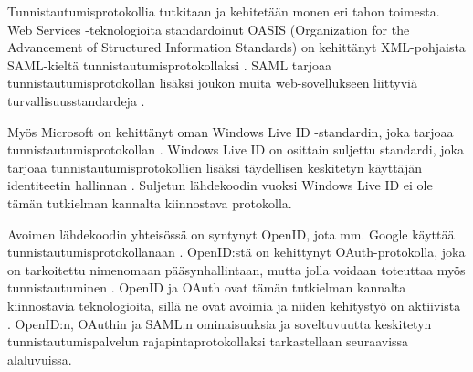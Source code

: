 Tunnistautumisprotokollia tutkitaan ja kehitetään monen eri tahon toimesta. Web Services -teknologioita standardoinut OASIS (Organization for the Advancement of Structured Information Standards) on kehittänyt XML-pohjaista SAML-kieltä tunnistautumisprotokollaksi \cite{saml_spec}. SAML tarjoaa tunnistautumisprotokollan lisäksi joukon muita web-sovellukseen liittyviä turvallisuusstandardeja \cite{next_saml}.

Myös Microsoft on kehittänyt oman Windows Live ID -standardin, joka tarjoaa tunnistautumisprotokollan \cite{open_identity}. Windows Live ID on osittain suljettu standardi, joka tarjoaa tunnistautumisprotokollien lisäksi täydellisen keskitetyn käyttäjän identiteetin hallinnan \cite{open_identity}. Suljetun lähdekoodin vuoksi Windows Live ID ei ole tämän tutkielman kannalta kiinnostava protokolla.

Avoimen lähdekoodin yhteisössä on syntynyt OpenID, jota mm. Google käyttää tunnistautumisprotokollanaan \cite{open_identity}. OpenID:stä on kehittynyt OAuth-pro\-to\-kol\-la, joka on tarkoitettu nimenomaan pääsynhallintaan, mutta jolla voidaan toteuttaa myös tunnistautuminen \cite{formal_oauth}. OpenID ja OAuth ovat tämän tutkielman kannalta kiinnostavia teknologioita, sillä ne ovat avoimia ja niiden kehitystyö on aktiivista \cite{facebook}. OpenID:n, OAuthin ja SAML:n ominaisuuksia ja soveltuvuutta keskitetyn tunnistautumispalvelun rajapintaprotokollaksi tarkastellaan seuraavissa alaluvuissa.